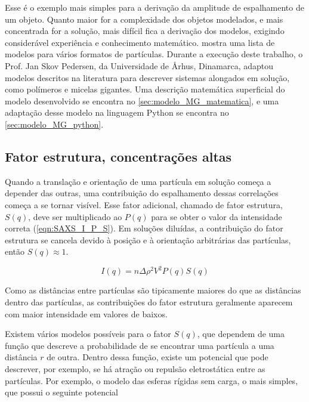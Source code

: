 		Esse é o exemplo mais simples para a derivação da amplitude de espalhamento de um objeto. Quanto maior for a complexidade dos objetos modelados, e mais concentrada for a solução, mais difícil fica a derivação dos modelos, exigindo considerável experiência e conhecimento matemático. \citeauthor{Pedersen1997b} mostra uma lista de modelos para vários formatos de partículas. Durante a execução deste trabalho, o Prof. Jan Skov Pedersen, da Universidade de \AA rhus, Dinamarca, adaptou modelos descritos na literatura para descrever sistemas alongados em solução, como polímeros e micelas gigantes. Uma descrição matemática superficial do modelo desenvolvido se encontra no \autoref{sec:modelo_MG_matematica}, e uma adaptação desse modelo na linguagem Python se encontra no \autoref{sec:modelo_MG_python}.
		
		\subsection{Fator estrutura, concentrações altas} 
		
		Quando a translação e orientação de uma partícula em solução começa a depender das outras, uma contribuição do espalhamento dessas correlações começa a se tornar visível. Esse fator adicional, chamado de fator estrutura, \(S(q)\), deve ser multiplicado ao \(P(q)\) para se obter o valor da intensidade correta (\autoref{eqn:SAXS_I_P_S}). Em soluções diluídas, a contribuição do fator estrutura se cancela devido à posição e à orientação arbitrárias das partículas, então \(S(q) \approx 1\).\cite{Narayanan2008a}
		
		\begin{equation}
			I(q) = n\Delta \rho^2 V^2 P(q) S(q)
			\label{eqn:SAXS_I_P_S}
		\end{equation}
		
		Como as distâncias entre partículas são tipicamente maiores do que as distâncias dentro das partículas, as contribuições do fator estrutura geralmente aparecem com maior intensidade em valores de \q{} baixos.\cite{Glatter2018livro}
		
		Existem vários modelos possíveis para o fator \(S(q)\), que dependem de uma função que descreve a probabilidade de se encontrar uma partícula a uma distância \(r\) de outra. Dentro dessa função, existe um potencial que pode descrever, por exemplo, se há atração ou repulsão eletrostática entre as partículas. Por exemplo, o modelo das esferas rígidas sem carga, o mais simples, que possui o seguinte potencial \cite{Glatter2018livro}
		
